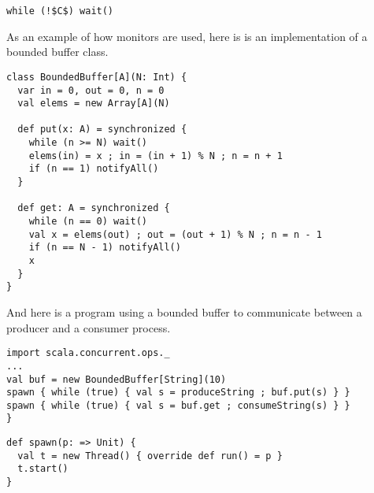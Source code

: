 \begin{lstlisting}
while (!$C$) wait()
\end{lstlisting}

As an example of how monitors are used, here is is an implementation
of a bounded buffer class.
\begin{lstlisting}
class BoundedBuffer[A](N: Int) {
  var in = 0, out = 0, n = 0
  val elems = new Array[A](N)

  def put(x: A) = synchronized {
    while (n >= N) wait()
    elems(in) = x ; in = (in + 1) % N ; n = n + 1
    if (n == 1) notifyAll()
  }

  def get: A = synchronized {
    while (n == 0) wait()
    val x = elems(out) ; out = (out + 1) % N ; n = n - 1
    if (n == N - 1) notifyAll()
    x
  }
}
\end{lstlisting}
And here is a program using a bounded buffer to communicate between a
producer and a consumer process.
\begin{lstlisting}
import scala.concurrent.ops._
...
val buf = new BoundedBuffer[String](10)
spawn { while (true) { val s = produceString ; buf.put(s) } }
spawn { while (true) { val s = buf.get ; consumeString(s) } }
}
\end{lstlisting}
\begin{lstlisting}
def spawn(p: => Unit) {
  val t = new Thread() { override def run() = p }
  t.start()
}
\end{lstlisting}


